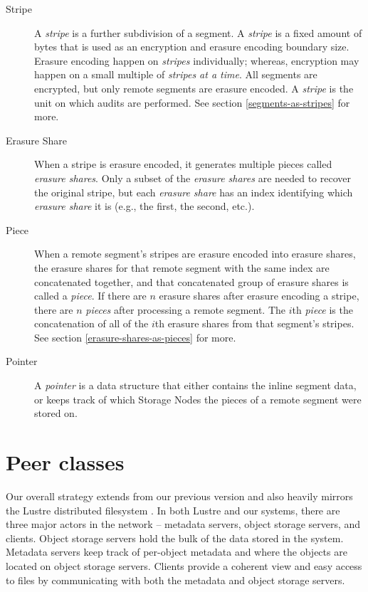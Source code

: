 \documentclass[8pt,fleqn,openany]{book}
\begin{document}
\begin{description}
\item[Stripe] A {\em stripe} is a further subdivision of a segment. A
{\em stripe} is a fixed amount of bytes that is used as an encryption and erasure
encoding boundary size. Erasure encoding happen on {\em stripes} individually;
whereas, encryption may happen on a small multiple of {\em stripes at a time}. All
segments are encrypted, but only remote segments are erasure encoded.
A {\em stripe} is the unit on which audits are performed.
See section \ref{segments-as-stripes} for more.

\item[Erasure Share] When a stripe is erasure encoded, it generates
multiple pieces called {\em erasure shares}. Only a subset of the {\em erasure
shares} are needed to recover the original stripe, but each {\em erasure
share} has an index identifying which {\em erasure share} it is (e.g., the first,
the second, etc.).

\item[Piece] When a remote segment's stripes are erasure encoded into
erasure shares, the erasure shares for that remote segment with the
same index are concatenated together, and that concatenated group of erasure
shares is called a {\em piece}. If there are $n$ erasure shares after erasure
encoding a stripe, there are $n$ {\em pieces} after processing a remote
segment. The $i$th {\em piece} is the concatenation of all of the $i$th
erasure shares from that segment's stripes.
See section \ref{erasure-shares-as-pieces} for more.

\item[Pointer] A {\em pointer} is a data structure that either contains the
inline segment data, or keeps track of which
Storage Nodes the pieces of a remote segment were stored on.
\end{description}

\section{Peer classes}

Our overall strategy extends from our previous version \cite{storj-v2} and
also heavily mirrors the Lustre distributed filesystem \cite{lustre}. In
both Lustre and our systems, there are three major actors in the network --
metadata servers, object storage servers, and clients. Object
storage servers hold the bulk of the data stored in the system. Metadata
servers keep track of per-object metadata and where the objects are located
on object storage servers. Clients provide a coherent view and easy access
to files by communicating with both the metadata and object storage servers.
\end{document}
